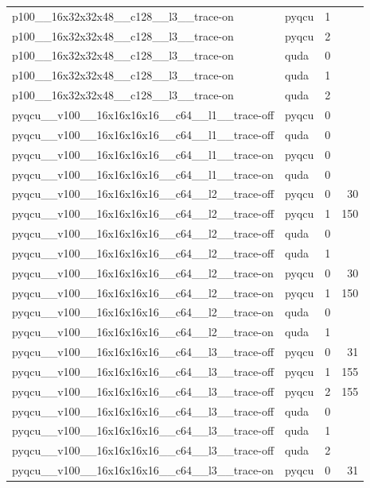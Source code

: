 \begin{table}[htbp]
\begin{tabular}{@{}llrr@{}}
p100\_\_16x32x32x48\_\_c128\_\_l3\_\_trace-on & pyqcu & 1 &  \\
p100\_\_16x32x32x48\_\_c128\_\_l3\_\_trace-on & pyqcu & 2 &  \\
p100\_\_16x32x32x48\_\_c128\_\_l3\_\_trace-on & quda & 0 &  \\
p100\_\_16x32x32x48\_\_c128\_\_l3\_\_trace-on & quda & 1 &  \\
p100\_\_16x32x32x48\_\_c128\_\_l3\_\_trace-on & quda & 2 &  \\
pyqcu\_\_v100\_\_16x16x16x16\_\_c64\_\_l1\_\_trace-off & pyqcu & 0 &  \\
pyqcu\_\_v100\_\_16x16x16x16\_\_c64\_\_l1\_\_trace-off & quda & 0 &  \\
pyqcu\_\_v100\_\_16x16x16x16\_\_c64\_\_l1\_\_trace-on & pyqcu & 0 &  \\
pyqcu\_\_v100\_\_16x16x16x16\_\_c64\_\_l1\_\_trace-on & quda & 0 &  \\
pyqcu\_\_v100\_\_16x16x16x16\_\_c64\_\_l2\_\_trace-off & pyqcu & 0 & 30 \\
pyqcu\_\_v100\_\_16x16x16x16\_\_c64\_\_l2\_\_trace-off & pyqcu & 1 & 150 \\
pyqcu\_\_v100\_\_16x16x16x16\_\_c64\_\_l2\_\_trace-off & quda & 0 &  \\
pyqcu\_\_v100\_\_16x16x16x16\_\_c64\_\_l2\_\_trace-off & quda & 1 &  \\
pyqcu\_\_v100\_\_16x16x16x16\_\_c64\_\_l2\_\_trace-on & pyqcu & 0 & 30 \\
pyqcu\_\_v100\_\_16x16x16x16\_\_c64\_\_l2\_\_trace-on & pyqcu & 1 & 150 \\
pyqcu\_\_v100\_\_16x16x16x16\_\_c64\_\_l2\_\_trace-on & quda & 0 &  \\
pyqcu\_\_v100\_\_16x16x16x16\_\_c64\_\_l2\_\_trace-on & quda & 1 &  \\
pyqcu\_\_v100\_\_16x16x16x16\_\_c64\_\_l3\_\_trace-off & pyqcu & 0 & 31 \\
pyqcu\_\_v100\_\_16x16x16x16\_\_c64\_\_l3\_\_trace-off & pyqcu & 1 & 155 \\
pyqcu\_\_v100\_\_16x16x16x16\_\_c64\_\_l3\_\_trace-off & pyqcu & 2 & 155 \\
pyqcu\_\_v100\_\_16x16x16x16\_\_c64\_\_l3\_\_trace-off & quda & 0 &  \\
pyqcu\_\_v100\_\_16x16x16x16\_\_c64\_\_l3\_\_trace-off & quda & 1 &  \\
pyqcu\_\_v100\_\_16x16x16x16\_\_c64\_\_l3\_\_trace-off & quda & 2 &  \\
pyqcu\_\_v100\_\_16x16x16x16\_\_c64\_\_l3\_\_trace-on & pyqcu & 0 & 31 \\

\end{tabular}
\end{table}

